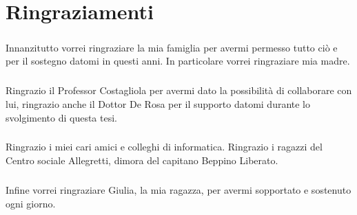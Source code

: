 \chapter*{Ringraziamenti}
    \paragraph{}
        Innanzitutto vorrei ringraziare la mia famiglia per avermi permesso tutto ciò e per il sostegno datomi in questi anni. In particolare vorrei ringraziare mia madre.

    \paragraph{}
        Ringrazio il Professor Costagliola per avermi dato la possibilità di collaborare con lui, ringrazio anche il Dottor De Rosa per il supporto datomi durante lo svolgimento di questa tesi.

    \paragraph{}
        Ringrazio i miei cari amici e colleghi di informatica. Ringrazio i ragazzi del Centro sociale Allegretti, dimora del capitano Beppino Liberato. 

    \paragraph{}
        Infine vorrei ringraziare Giulia, la mia ragazza, per avermi sopportato e sostenuto ogni giorno.
